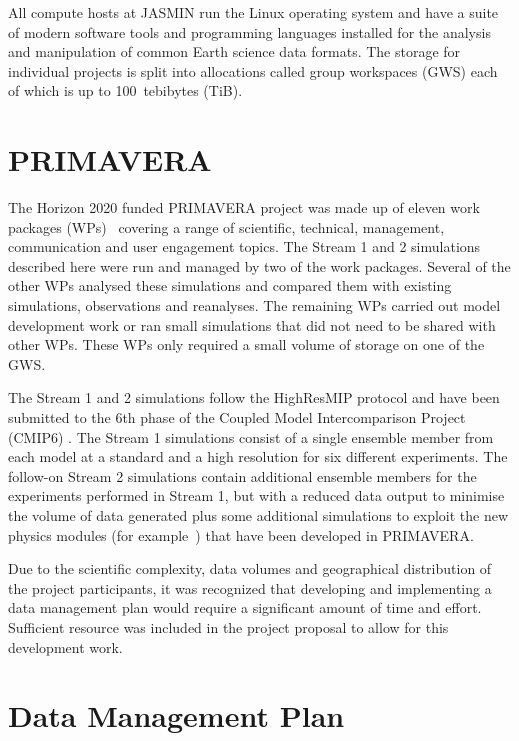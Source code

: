 \documentclass[gmd, manuscript]{copernicus}
\begin{document}
All compute hosts at JASMIN run the Linux operating system and have a suite of modern software tools and programming languages installed for the analysis and manipulation of common Earth science data formats. The storage for individual projects is split into allocations called group workspaces (GWS) each of which is up to 100~tebibytes (TiB).

\section{PRIMAVERA}

The Horizon 2020 funded PRIMAVERA project was made up of eleven work packages (WPs)~\citep{GrantAgree} covering a range of scientific, technical, management, communication and user engagement topics. The Stream 1 and 2 simulations described here were run and managed by two of the work packages. Several of the other WPs analysed these simulations and compared them with existing simulations, observations and reanalyses. The remaining WPs carried out model development work or ran small simulations that did not need to be shared with other WPs. These WPs only required a small volume of storage on one of the GWS.

The Stream 1 and 2 simulations follow the HighResMIP protocol and have been submitted to the 6th phase of the Coupled Model Intercomparison Project (CMIP6) \citep{Eyring2016}. The Stream 1 simulations consist of a single ensemble member from each model at a standard and a high resolution for six different experiments. The follow-on Stream 2 simulations contain additional ensemble members for the experiments performed in Stream 1, but with a reduced data output to minimise the volume of data generated plus some additional simulations to exploit the new physics modules (for example~\citep{Nurser2020}) that have been developed in PRIMAVERA.

Due to the scientific complexity, data volumes and geographical distribution of the project participants, it was recognized that developing and implementing a data management plan would require a significant amount of time and effort. Sufficient resource was included in the project proposal to allow for this development work.


\section{Data Management Plan}
\end{document}
